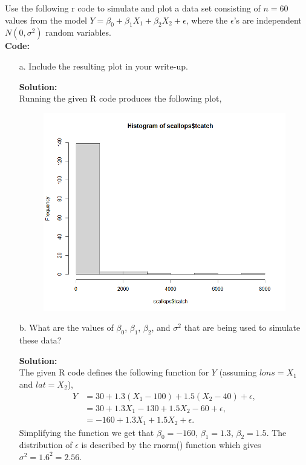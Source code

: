 \documentclass[12pt]{article}
\makeatletter
\theoremstyle{homework}
\newenvironment{exercise}[1]
{\def\@currentlabel{#1}\exercisecore}
{\endexercisecore}
\newcommand{\localhead}[1]{\par\smallskip\noindent\textbf{#1}\nobreak\\}%
\newcommand\solution{\localhead{Solution:}}
\makeatother
\begin{document}
\begin{exercise}{1} Use the following r code to simulate and plot a data set 
  consisting of $n = 60$ values from the model $Y = \beta_0 + \beta_1 X_1 + 
  \beta_2 X_2 + \epsilon$, where the $\epsilon$'s  are independent $N(0,\sigma ^2)$
  random variables.\\
  \textbf{Code:}
        \begin{center}
        
        \end{center}
\begin{enumerate}
  \item[a.] Include the resulting plot in your write-up.\\
  \solution Running the given R code produces the following plot,
  \begin{figure}[H]
    \begin{center}
    \includegraphics[width = \textwidth]{Rplot.png}
    \end{center}
  \end{figure}
  \vspace{.15in} 




  \item[b.] What are the values of $\beta_0$, $\beta_1$, $\beta_2$, and $\sigma^2$ 
  that are being used to simulate these data?\\
  \solution The given R code defines the following function for $Y$ (assuming $lons = X_1$ and $lat = X_2$),
  \begin{align*}
    Y &= 30 + 1.3(X_1 - 100) + 1.5(X_2 - 40) + \epsilon,\\
      &= 30 + 1.3X_1 - 130 + 1.5X_2 - 60 + \epsilon,\\
      &= -160 + 1.3X_1 + 1.5X_2 + \epsilon.
  \end{align*}
  Simplifying the function we get that $\beta_0 = -160$, $\beta_1 = 1.3$, $\beta_2 = 1.5$. The distribution of $\epsilon$ is 
  described by the rnorm() function which gives $\sigma^2 = 1.6^2 = 2.56$.
  \vspace{.15in}  






\end{enumerate}
\end{exercise}
\end{document}

